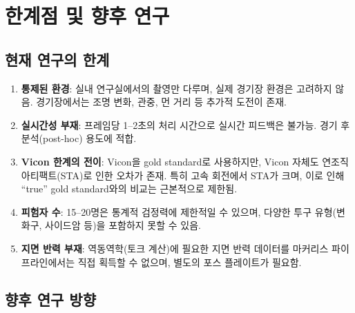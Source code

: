 \documentclass[11pt, a4paper]{report}
\begin{document}
\chapter{한계점 및 향후 연구}
\label{ch:limitations}

\section{현재 연구의 한계}

\begin{enumerate}[leftmargin=*]
  \item \textbf{통제된 환경}: 실내 연구실에서의 촬영만 다루며, 실제 경기장 환경은 고려하지 않음.
        경기장에서는 조명 변화, 관중, 먼 거리 등 추가적 도전이 존재.

  \item \textbf{실시간성 부재}: 프레임당 1--2초의 처리 시간으로 실시간 피드백은 불가능.
        경기 후 분석(post-hoc) 용도에 적합.

  \item \textbf{Vicon 한계의 전이}: Vicon을 gold standard로 사용하지만,
        Vicon 자체도 연조직 아티팩트(STA)로 인한 오차가 존재.
        특히 고속 회전에서 STA가 크며, 이로 인해 ``true'' gold standard와의 비교는 근본적으로 제한됨.

  \item \textbf{피험자 수}: 15--20명은 통계적 검정력에 제한적일 수 있으며,
        다양한 투구 유형(변화구, 사이드암 등)을 포함하지 못할 수 있음.

  \item \textbf{지면 반력 부재}: 역동역학(토크 계산)에 필요한 지면 반력 데이터를
        마커리스 파이프라인에서는 직접 획득할 수 없으며,
        별도의 포스 플레이트가 필요함.
\end{enumerate}


\section{향후 연구 방향}
\end{document}
